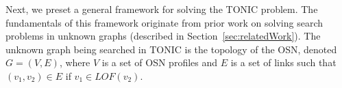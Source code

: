 \documentclass[prodmode,acmtecs]{acmsmall} %
\newcommand{\note}[2]{\textbf{\textsc{#1} says: \textit{#2}}}
\newcommand{\acquire}[1]{{\em Acquire(#1)}}
\begin{document}




Next, we preset a general framework for solving the TONIC problem. The fundamentals of this framework originate from prior work on solving search problems in unknown graphs (described in Section~\ref{sec:relatedWork}). The unknown graph being searched in TONIC is the topology of the OSN, denoted $G=(V,E)$, where $V$ is a set of OSN profiles and $E$ is a set of links such that \((v_1,v_2)\in E\) if $v_1\in LOF(v_2)$. 
\end{document}
